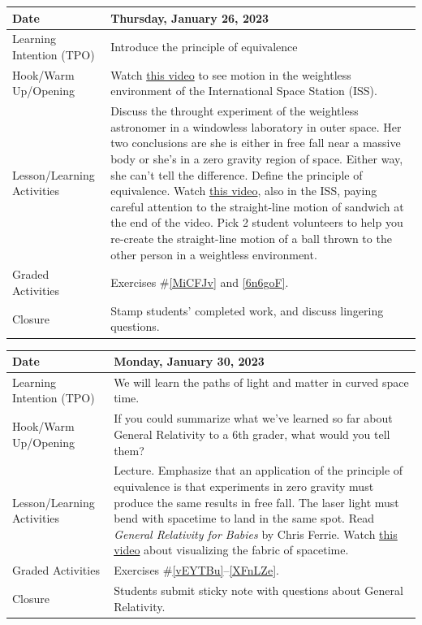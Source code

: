 \documentclass{article}
\numberwithin{equation}{section}
\numberwithin{figure}{section}
\begin{document}
\begin{tabular}{|m{}|m{}|}
    \hline  
    \cellcolor{black!20}\textbf{Date} &
    \cellcolor{black!20}\textbf{Thursday, January 26, 2023} \\
    \hline
    Learning Intention (TPO) &  Introduce the \gls{principle of equivalence}\\
    \hline
    Hook/Warm Up/Opening & Watch \href{https://youtu.be/WMK36dpHIkg}{this video} to see motion in the weightless environment of the International Space Station (ISS). \\
    \hline
    Lesson/Learning Activities & Discuss the throught experiment of the weightless astronomer in a windowless laboratory in outer space. Her two conclusions are she is either in free fall near a massive body or she's in a zero gravity region of space. Either way, she can't tell the difference. Define the \gls{principle of equivalence}. Watch \href{https://youtu.be/DjpueFi5Jms}{this video}, also in the ISS, paying careful attention to the straight-line motion of sandwich at the end of the video. Pick 2 student volunteers to help you re-create the straight-line motion of a ball thrown to the other person in a weightless environment.\\
    \hline
    Graded Activities &  Exercises \#\ref{MiCFJv} and \ref{6n6goF}.\\
    \hline
    Closure & Stamp students' completed work, and discuss lingering questions.\\  
    \hline
\end{tabular}

\begin{tabular}{|m{}|m{}|}
    \hline  
    \cellcolor{black!20}\textbf{Date} &
    \cellcolor{black!20}\textbf{Monday, January 30, 2023} \\
    \hline
    Learning Intention (TPO) &  We will learn the paths of light and matter in curved space time.\\
    \hline
    Hook/Warm Up/Opening & If you could summarize what we've learned so far about General Relativity to a 6th grader, what would you tell them?\\
    \hline
    Lesson/Learning Activities & Lecture. Emphasize that an application of the principle of equivalence is that experiments in zero gravity must produce the same results in free fall. The laser light must bend with spacetime to land in the same spot. Read \textit{General Relativity for Babies} by Chris Ferrie. Watch \href{https://youtu.be/MTY1Kje0yLg}{this video} about visualizing the fabric of spacetime.\\
    \hline
    Graded Activities & Exercises \#\ref{vEYTBu}--\ref{XFnLZe}. \\
    \hline
    Closure & Students submit sticky note with questions about General Relativity.\\  
    \hline
\end{tabular}  
\end{document}
